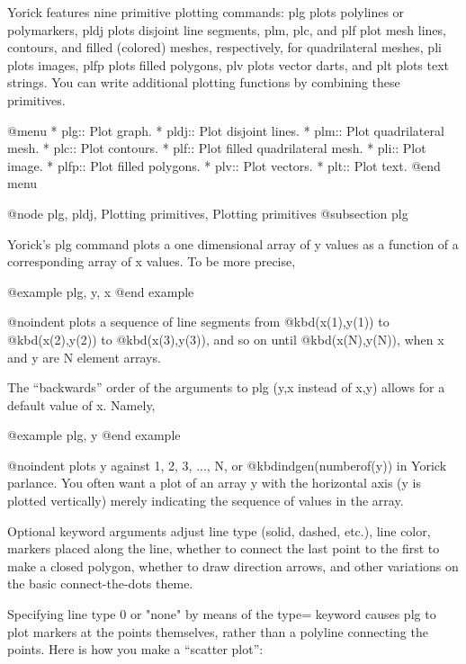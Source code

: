 Yorick features nine primitive plotting commands: plg plots polylines
or polymarkers, pldj plots disjoint line segments, plm, plc, and plf
plot mesh lines, contours, and filled (colored) meshes, respectively,
for quadrilateral meshes, pli plots images, plfp plots filled
polygons, plv plots vector darts, and plt plots text strings.  You can
write additional plotting functions by combining these primitives.

@menu
* plg::                         Plot graph.
* pldj::                        Plot disjoint lines.
* plm::                         Plot quadrilateral mesh.
* plc::                         Plot contours.
* plf::                         Plot filled quadrilateral mesh.
* pli::                         Plot image.
* plfp::                        Plot filled polygons.
* plv::                         Plot vectors.
* plt::                         Plot text.
@end menu

@node plg, pldj, Plotting primitives, Plotting primitives
@subsection plg

Yorick's plg command plots a one dimensional array of y values
as a function of a corresponding array of x values.  To be more
precise,

@example
plg, y, x
@end example

@noindent
plots a sequence of line segments from @kbd{(x(1),y(1))} to
@kbd{(x(2),y(2))} to @kbd{(x(3),y(3))}, and so on until
@kbd{(x(N),y(N))}, when x and y are N element arrays.

The ``backwards'' order of the arguments to plg (y,x instead of x,y)
allows for a default value of x.  Namely,

@example
plg, y
@end example

@noindent
plots y against 1, 2, 3, ..., N, or @kbd{indgen(numberof(y))} in Yorick
parlance.  You often want a plot of an array y with the horizontal
axis (y is plotted vertically) merely indicating the sequence of
values in the array.

Optional keyword arguments adjust line type (solid, dashed, etc.), line
color, markers placed along the line, whether to connect the last point
to the first to make a closed polygon, whether to draw direction arrows,
and other variations on the basic connect-the-dots theme.

Specifying line type 0 or "none" by means of the type= keyword causes
plg to plot markers at the points themselves, rather than a polyline
connecting the points.  Here is how you make a ``scatter plot'':

